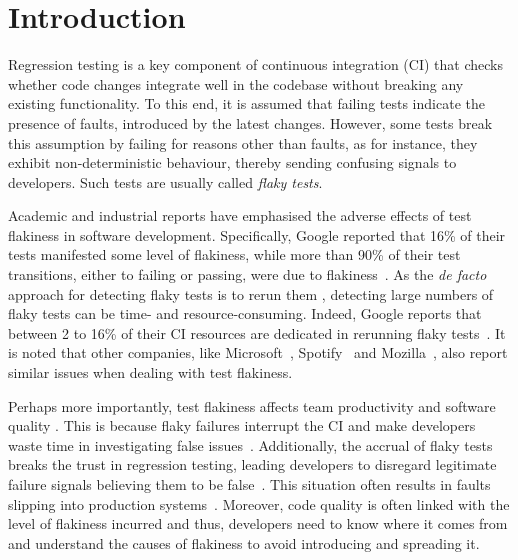 \section{Introduction}
\label{sec:sherloc-introduction}

Regression testing is a key component of continuous integration (CI) that checks whether code changes integrate well in the codebase without breaking any existing functionality. To this end, it is assumed that failing tests indicate the presence of faults, introduced by the latest changes. However, some tests break this assumption by failing for reasons other than faults, as for instance,  they exhibit non-deterministic behaviour, thereby sending confusing signals to developers. Such tests are usually called \textit{flaky tests}.

Academic and industrial reports have emphasised the adverse effects of test flakiness in software development. Specifically, Google reported that 16\% of their tests manifested some level of flakiness, while more than 90\% of their test transitions, either to failing or passing, were due to flakiness~\cite{LeongSPTM19}. %
As the \textit{de facto} approach for detecting flaky tests is to rerun them \cite{habchi2021qualitative, GruberFraser22}, detecting large numbers of flaky tests can be time- and resource-consuming. Indeed, Google reports that between 2 to 16\% of their CI resources are dedicated in rerunning flaky tests~\cite{Micco2017}. It is noted  that other companies, like Microsoft~\cite{Lam2020b},  Spotify~\cite{FlakinessSpotify} and Mozilla~\cite{Rahman2018}, also report similar issues when dealing with test flakiness. 

Perhaps more importantly, test flakiness affects team productivity and software quality \cite{habchi2021qualitative}. This is because flaky failures interrupt the CI and make developers waste time in investigating false issues~\cite{GTAC2016,Eck2019,LeongSPTM19,habchi2021qualitative}. Additionally, the accrual of flaky tests breaks the trust in regression testing, leading developers to disregard legitimate failure signals believing them to be false~\cite{habchi2021qualitative, GruberFraser22}. This situation often results in faults slipping into production systems~\cite{Rahman2018}. Moreover, code quality is often linked with the level of flakiness incurred \cite{habchi2021qualitative} and thus, developers need to know where it comes from and understand the causes of flakiness to avoid introducing and spreading it. 

